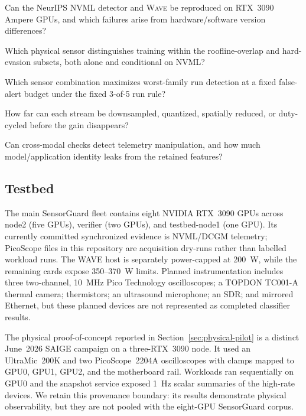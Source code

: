 \documentclass[sigplan,anonymous,review,nonacm]{acmart}
\newcommand{\wave}{\textsc{Wave}}
\begin{document}
\begin{description}[style=multiline,leftmargin=3.0cm,labelwidth=2.8cm]
\item[RQ1: Baseline fidelity.] Can the NeurIPS NVML detector and \wave{} be reproduced on RTX~3090 Ampere GPUs, and which failures arise from hardware/software version differences?
\item[RQ2: Single-sensor value.] Which physical sensor distinguishes training within the roofline-overlap and hard-evasion subsets, both alone and conditional on NVML?
\item[RQ3: Fusion and decision.] Which sensor combination maximizes worst-family run detection at a fixed false-alert budget under the fixed 3-of-5 run rule?
\item[RQ4: Hardware requirements.] How far can each stream be downsampled, quantized, spatially reduced, or duty-cycled before the gain disappears?
\item[RQ5: Robustness and privacy.] Can cross-modal checks detect telemetry manipulation, and how much model/application identity leaks from the retained features?
\end{description}

\subsection{Testbed}

The main SensorGuard fleet contains eight NVIDIA RTX~3090 GPUs across node2 (five GPUs), verifier (two GPUs), and testbed-node1 (one GPU). Its currently committed synchronized evidence is NVML/DCGM telemetry; PicoScope files in this repository are acquisition dry-runs rather than labelled workload runs. The WAVE host is separately power-capped at 200~W, while the remaining cards expose 350--370~W limits. Planned instrumentation includes three two-channel, 10~MHz Pico Technology oscilloscopes; a TOPDON TC001-A thermal camera; thermistors; an ultrasound microphone; an SDR; and mirrored Ethernet, but these planned devices are not represented as completed classifier results.

The physical proof-of-concept reported in Section~\ref{sec:physical-pilot} is a distinct June~2026 SAIGE campaign on a three-RTX~3090 node. It used an UltraMic~200K and two PicoScope~2204A oscilloscopes with clamps mapped to GPU0, GPU1, GPU2, and the motherboard rail. Workloads ran sequentially on GPU0 and the snapshot service exposed 1~Hz scalar summaries of the high-rate devices. We retain this provenance boundary: its results demonstrate physical observability, but they are not pooled with the eight-GPU SensorGuard corpus.
\end{document}
